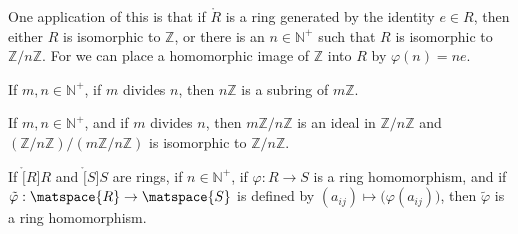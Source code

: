 \documentclass{book}                                                           %
\begin{document}
            One application of this is that if $\ring{R}$ is a ring
            generated by the identity $e\in{R}$, then either $R$ is
            isomorphic to $\mathbb{Z}$, or there is an $n\in\mathbb{N}^{+}$
            such that $R$ is isomorphic to $\mathbb{Z}/n\mathbb{Z}$. For we
            can place a homomorphic image of $\mathbb{Z}$ into $R$ by
            $\varphi(n)=ne$.
            \begin{theorem}
                If $m,n\in\mathbb{N}^{+}$, if $m$ divides $n$, then
                $n\mathbb{Z}$ is a subring of $m\mathbb{Z}$.
            \end{theorem}
            \begin{theorem}
                If $m,n\in\mathbb{N}^{+}$, and if $m$ divides $n$, then
                $m\mathbb{Z}/n\mathbb{Z}$ is an ideal in
                $\mathbb{Z}/n\mathbb{Z}$ and
                $(\mathbb{Z}/n\mathbb{Z})/(m\mathbb{Z}/n\mathbb{Z})$ is
                isomorphic to $\mathbb{Z}/n\mathbb{Z}$.
            \end{theorem}
            \begin{theorem}
                If $\ring[R]{R}$ and $\ring[S]{S}$ are rings, if
                $n\in\mathbb{N}^{+}$, if $\varphi:R\rightarrow{S}$ is a
                ring homomorphism, and if
                $\tilde{\varphi}:\matspace{R}\rightarrow\matspace{S}$ is
                defined by $(a_{ij})\mapsto\big(\varphi(a_{ij})\big)$,
                then $\tilde{\varphi}$ is a ring homomorphism.
            \end{theorem}
\end{document}
